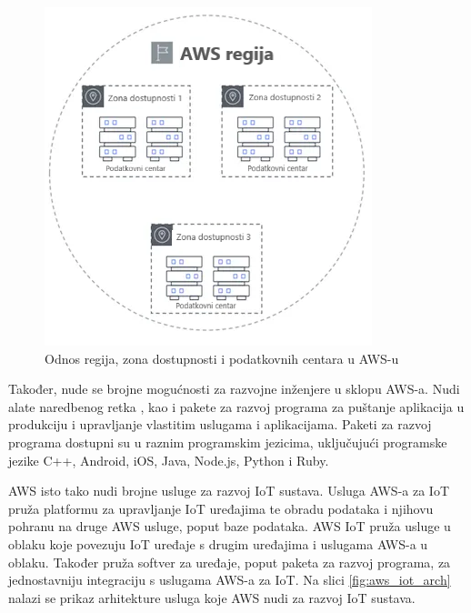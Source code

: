 \begin{figure}[ht]
	\centering
	\includegraphics[scale=0.6]{imgs/aws_regions}
	\caption{Odnos regija, zona dostupnosti i podatkovnih centara u AWS-u \cite{ec2}}
	\label{fig:aws_regions}
\end{figure}

Također, nude se brojne mogućnosti za razvojne inženjere u sklopu AWS-a. Nudi alate naredbenog retka , kao i pakete za razvoj programa  za puštanje aplikacija u produkciju  i upravljanje vlastitim uslugama i aplikacijama. Paketi za razvoj programa dostupni su u raznim programskim jezicima, uključujući programske jezike C++, Android, iOS, Java, Node.js, Python i Ruby.

AWS isto tako nudi brojne usluge za razvoj IoT sustava. Usluga AWS-a za IoT pruža platformu za upravljanje IoT uređajima te obradu podataka i njihovu pohranu na druge AWS usluge, poput baze podataka. AWS IoT pruža usluge u oblaku koje povezuju IoT uređaje s drugim uređajima i uslugama AWS-a u oblaku. Također pruža softver za uređaje, poput paketa za razvoj programa, za jednostavniju integraciju s uslugama AWS-a za IoT. Na slici \ref{fig:aws_iot_arch} nalazi se prikaz arhitekture usluga koje AWS nudi za razvoj IoT sustava.

